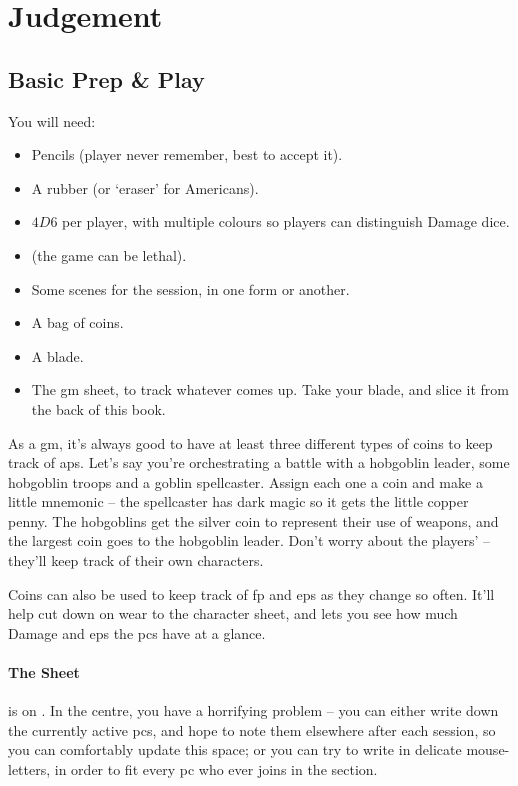 \chapter[Bastion of Judgement]{Judgement}
\label{judgement}

\section{Basic Prep \& Play}

\begin{multicols}{2}

You will need:

\begin{itemize}
  \item
  Pencils (player never remember, best to accept it).
  \item
  A rubber (or `eraser' for Americans).
  \item
  $4D6$ per player, with multiple colours so players can distinguish Damage dice.
  \item
  \iftoggle{stories}{
    A boat-load of character sheets
  }{
    Some pre-made characters, including spares
  } (the game can be lethal).
  \item
  Some scenes for the session, in one form or another.
  \item
  A bag of coins.
  \item
  A blade.
  \item
  The \gls{gm} sheet, to track whatever comes up.
  Take your blade, and slice it from the back of this book.
\end{itemize}

As a \gls{gm}, it's always good to have at least three different types of coins to keep track of \glspl{ap}.
Let's say you're orchestrating a battle with a hobgoblin leader, some hobgoblin troops and a goblin spellcaster.
Assign each one a coin and make a little mnemonic -- the spellcaster has dark magic so it gets the little copper penny.
The hobgoblins get the silver coin to represent their use of weapons, and the largest coin goes to the hobgoblin leader.
Don't worry about the players'  -- they'll keep track of their own characters.

Coins can also be used to keep track of \gls{fp} and \glspl{ep} as they change so often.
It'll help cut down on wear to the character sheet, and lets you see how much Damage and \glspl{ep} the \glspl{pc} have at a glance.

\subsubsection{The  Sheet}
is on .
In the centre, you have a horrifying problem -- you can either write down the currently active \glspl{pc}, and hope to note them elsewhere after each session, so you can comfortably update this space; or you can try to write in delicate mouse-letters, in order to fit every \gls{pc} who ever joins in the section.


\end{multicols}
